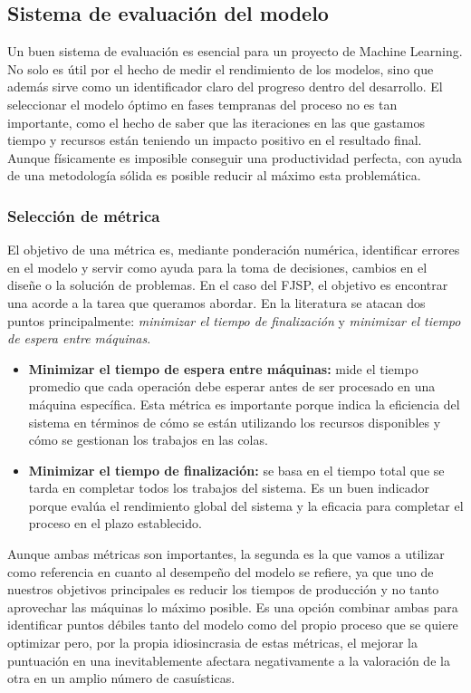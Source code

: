 \subsection{Sistema de evaluación del modelo}
Un buen sistema de evaluación es esencial para un proyecto de Machine Learning.
No solo es útil por el hecho de medir el rendimiento de los modelos,
sino que además sirve como un identificador claro del progreso dentro del desarrollo.
El seleccionar el modelo óptimo en fases tempranas del proceso no es tan importante,
como el hecho de saber que las iteraciones en las que gastamos tiempo y recursos están teniendo un impacto
positivo en el resultado final. Aunque físicamente es imposible conseguir una productividad
perfecta, con ayuda de una metodología sólida es posible reducir al máximo esta problemática.

\subsubsection{Selección de métrica}
El objetivo de una métrica es, mediante ponderación numérica, identificar errores en el modelo y
servir como ayuda para la toma de decisiones, cambios en el diseñe o la solución de problemas. En el caso del
FJSP, el objetivo es encontrar una acorde a la tarea que queramos abordar. En la literatura se atacan dos puntos
principalmente: \textit{minimizar el tiempo de finalización} y \textit{minimizar el tiempo de espera entre máquinas}.

\begin{itemize}
    \item \textbf{Minimizar el tiempo de espera entre máquinas:} mide el tiempo promedio que cada operación debe
          esperar antes de ser procesado en una máquina específica. Esta métrica es importante porque
          indica la eficiencia del sistema en términos de cómo se están utilizando los recursos disponibles
          y cómo se gestionan los trabajos en las colas.
    \item \textbf{Minimizar el tiempo de finalización:} se basa en el tiempo total que se tarda en completar todos
          los trabajos del sistema. Es un buen indicador porque evalúa el rendimiento global del sistema
          y la eficacia para completar el proceso en el plazo establecido.
\end{itemize}

Aunque ambas métricas son importantes, la segunda es la que vamos a utilizar como referencia en cuanto al
desempeño del modelo se refiere, ya que uno de nuestros objetivos principales es reducir los tiempos de producción y no tanto
aprovechar las máquinas lo máximo posible. Es una opción combinar ambas para identificar puntos débiles tanto del modelo
como del propio proceso que se quiere optimizar pero, por la propia idiosincrasia de estas métricas, el mejorar la puntuación
en una inevitablemente afectara negativamente a la valoración de la otra en un amplio número de casuísticas.

